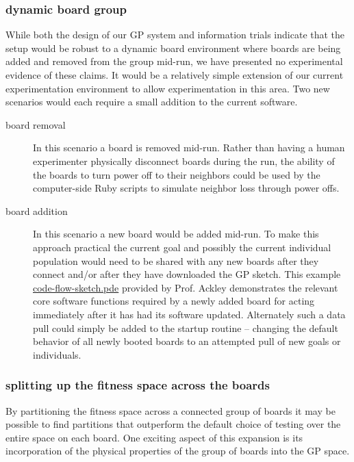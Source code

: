 \documentclass[11pt]{article}
\begin{document}
\subsubsection*{dynamic board group}
\label{sec-1.7.2}

While both the design of our GP system and information trials indicate
that the setup would be robust to a dynamic board environment where
boards are being added and removed from the group mid-run, we have
presented no experimental evidence of these claims.  It would be a
relatively simple extension of our current experimentation environment
to allow experimentation in this area.  Two new scenarios would each
require a small addition to the current software.

\begin{description}
\item[board removal] In this scenario a board is removed mid-run.
     Rather than having a human experimenter physically disconnect
     boards during the run, the ability of the boards to turn power
     off to their neighbors could be used by the computer-side Ruby
     scripts to simulate neighbor loss through power offs.
\item[board addition] In this scenario a new board would be added
     mid-run.  To make this approach practical the current goal and
     possibly the current individual population would need to be
     shared with any new boards after they connect and/or after they
     have downloaded the GP sketch.  This example \href{file:///nfs/adaptive/eschulte/src/gp4ixm-report/src/code-flow-sketch.pde}{code-flow-sketch.pde}
     provided by Prof. Ackley demonstrates the relevant core software
     functions required by a newly added board for acting immediately
     after it has had its software updated.  Alternately such a data
     pull could simply be added to the startup routine -- changing the
     default behavior of all newly booted boards to an attempted pull
     of new goals or individuals.
\end{description}

\subsubsection*{splitting up the fitness space across the boards}
\label{sec-1.7.3}

By partitioning the fitness space across a connected group of boards
it may be possible to find partitions that outperform the default
choice of testing over the entire space on each board.  One exciting
aspect of this expansion is its incorporation of the physical
properties of the group of boards into the GP space.
\end{document}
